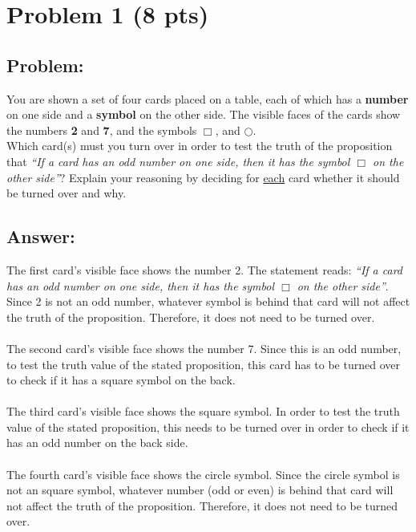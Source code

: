 \newpage

\section{Problem 1 (8 pts)}
\subsection{Problem:}

\noindent You are shown a set of four cards placed on a table, each of which has a \textbf{number} on one side and a \textbf{symbol} on the other side. The visible faces of the cards show the numbers \textbf{2} and \textbf{7}, and the symbols \textbf{$\Box$}, and \textbf{$\bigcirc$}.\\

\noindent Which card(s) must you turn over in order to test the truth of the proposition that \textit{``If a card has an odd number on one side, then it has the symbol $\Box$ on the other side''}? Explain your reasoning by deciding for \underline{each} card whether it should be turned over and why.\\

\subsection{Answer:}

The first card's visible face shows the number 2. The statement reads: \textit{``If a card has an odd number on one side, then it has the symbol $\Box$ on the other side''}. Since 2 is not an odd number, whatever symbol is behind that card will not affect the truth of the proposition. Therefore, it does not need to be turned over.\\ \\
The second card's visible face shows the number 7. Since this is an odd number, to test the truth value of the stated proposition, this card has to be turned over to check if it has a square symbol on the back. \\ \\
The third card's visible face shows the square symbol. In order to test the truth value of the stated proposition, this needs to be turned over in order to check if it has an odd number on the back side. \\ \\ 
The fourth card's visible face shows the circle symbol. Since the circle symbol is not an square symbol, whatever number (odd or even) is behind that card will not affect the truth of the proposition. Therefore, it does not need to be turned over.